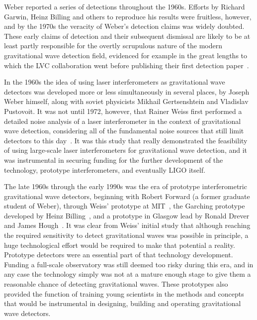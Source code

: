 Weber reported a series of detections throughout the 1960s. Efforts by Richard Garwin, Heinz Billing and others 
to reproduce his results were fruitless, however, and by the 1970s the veracity of Weber's detection claims was widely doubted. 
These early claims of detection and their subsequent dismissal are likely to be at least partly responsible for the 
overtly scrupulous nature of the modern gravitational wave detection field, evidenced for example in the great lengths to which 
the LVC collaboration went before publishing their first detection paper~\cite{GW150914}.

In the 1960s the idea of using laser interferometers as gravitational wave detectors was developed more or less simultaneously 
in several places, by Joseph Weber himself, along with soviet physicists Mikhail Gertsenshtein and Vladislav Pustovoit. 
It was not until 1972, however, that Rainer Weiss first performed a detailed noise analysis of a laser interferometer in the context 
of gravitational wave detection, considering all of the fundamental noise sources that still limit detectors to this day~\cite{Weiss1972}. 
It was this study that really demonstrated the feasibility of using large-scale laser interferometers for gravitational wave detection, and 
it was instrumental in securing funding for the further development of the technology, prototype interferometers, and eventually LIGO itself. 

The late 1960s through the early 1990s was the era of prototype interferometric gravitational wave detectors, beginning with 
Robert Forward (a former graduate student of Weber), through Weiss' prototype at MIT~\cite{MITprototype}, the Garching prototype developed by 
Heinz Billing~\cite{Shoemaker1988}, and a prototype in Glasgow lead by Ronald Drever and James Hough~\cite{JIF}. 
It was clear from Weiss' initial study that although reaching the required sensitivity to detect gravitational waves 
was possible in principle, a huge technological effort would 
be required to make that potential a reality. 
Prototype detectors were an essential part of that technology development. Funding a full-scale 
observatory was still deemed too risky during this era, and in any case the technology simply was not at a mature enough stage to give them 
a reasonable chance of detecting gravitational waves. These prototypes also provided the function 
of training young scientists in the methods and concepts that would be instrumental in 
designing, building and operating gravitational wave detectors. 

